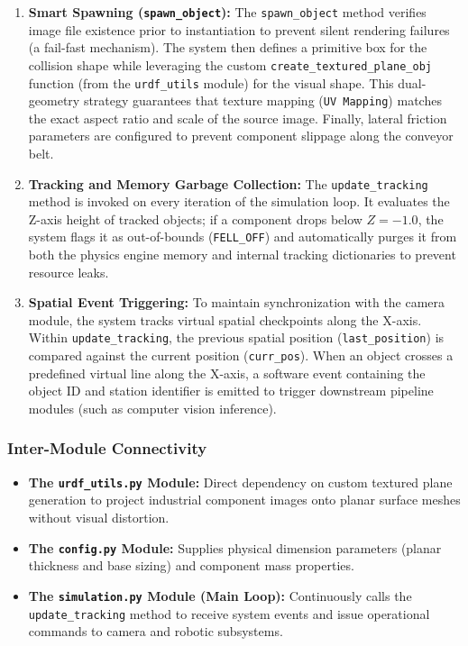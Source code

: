 \documentclass{article}
\begin{document}
\begin{enumerate}
	\item \textbf{Smart Spawning (\texttt{spawn\_object}):} The \texttt{spawn\_object} method verifies image file existence prior to instantiation to prevent silent rendering failures (a fail-fast mechanism). The system then defines a primitive box for the collision shape while leveraging the custom \texttt{create\_textured\_plane\_obj} function (from the \texttt{urdf\_utils} module) for the visual shape. This dual-geometry strategy guarantees that texture mapping (\texttt{UV Mapping}) matches the exact aspect ratio and scale of the source image. Finally, lateral friction parameters are configured to prevent component slippage along the conveyor belt.
	
	\item \textbf{Tracking and Memory Garbage Collection:} The \texttt{update\_tracking} method is invoked on every iteration of the simulation loop. It evaluates the Z-axis height of tracked objects; if a component drops below $Z = -1.0$, the system flags it as out-of-bounds (\texttt{FELL\_OFF}) and automatically purges it from both the physics engine memory and internal tracking dictionaries to prevent resource leaks.
	
	\item \textbf{Spatial Event Triggering:} To maintain synchronization with the camera module, the system tracks virtual spatial checkpoints along the X-axis. Within \texttt{update\_tracking}, the previous spatial position (\texttt{last\_position}) is compared against the current position (\texttt{curr\_pos}). When an object crosses a predefined virtual line along the X-axis, a software event containing the object ID and station identifier is emitted to trigger downstream pipeline modules (such as computer vision inference).
\end{enumerate}

\subsubsection{Inter-Module Connectivity}
\begin{itemize}
	\item \textbf{The \texttt{urdf\_utils.py} Module:} Direct dependency on custom textured plane generation to project industrial component images onto planar surface meshes without visual distortion.
	\item \textbf{The \texttt{config.py} Module:} Supplies physical dimension parameters (planar thickness and base sizing) and component mass properties.
	\item \textbf{The \texttt{simulation.py} Module (Main Loop):} Continuously calls the \texttt{update\_tracking} method to receive system events and issue operational commands to camera and robotic subsystems.
\end{itemize}
\end{document}
